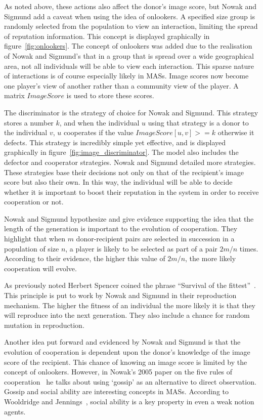 \documentclass[]{final_report}
\begin{document}
As noted above, these actions also affect the donor's image score, but Nowak and Sigmund add a caveat when using the idea of onlookers. A specified size group is randomly selected from the population to view an interaction, limiting the spread of reputation information. This concept is displayed graphically in figure~\ref{fig:onlookers}. The concept of onlookers was added due to the realisation of Nowak and Sigmund's that in a group that is spread over a wide geographical area, not all individuals will be able to view each interaction. This sparse nature of interactions is of course especially likely in MASs. Image scores now become one player's view of another rather than a community view of the player. A matrix $ImageScore$ is used to store these scores.\par
The discriminator is the strategy of choice for Nowak and Sigmund. This strategy stores a number $k$, and when the individual $u$ using that strategy is a donor to the individual $v$, $u$ cooperates if the value $ImageScore[u,v]>=k$ otherwise it defects. This strategy is incredibly simple yet effective, and is displayed graphically in figure~\ref{fig:image_discriminator}. The model also includes the defector and cooperator strategies. Nowak and Sigmund detailed more strategies. These strategies base their decisions not only on that of the recipient's image score but also their own. In this way, the individual will be able to decide whether it is important to boost their reputation in the system in order to receive cooperation or not.\par
Nowak and Sigmund hypothesize and give evidence supporting the idea that the length of the generation is important to the evolution of cooperation. They highlight that when $m$ donor-recipient pairs are selected in succession in a population of size $n$, a player is likely to be selected as part of a pair $2m/n$ times. According to their evidence, the higher this value of $2m/n$, the more likely cooperation will evolve.\par
As previously noted Herbert Spencer coined the phrase ``Survival of the fittest''~\cite{spencer1864principles}. This principle is put to work by Nowak and Sigmund in their reproduction mechanism. The higher the fitness of an individual the more likely it is that they will reproduce into the next generation. They also include a chance for random mutation in  reproduction.\par
Another idea put forward and evidenced by Nowak and Sigmund is that the evolution of cooperation is dependent upon the donor's knowledge of the image score of the recipient. This chance of knowing an image score is limited by the concept of onlookers. However, in Nowak's 2005 paper on the five rules of cooperation~\cite{five_rules_coop} he talks about using `gossip' as an alternative to direct observation. Gossip and social ability are interesting concepts in MASs. According to Wooldridge and Jennings~\cite{wooldridge_jennings_1995}, social ability is a key property in even a weak notion agents.\par
\end{document}
